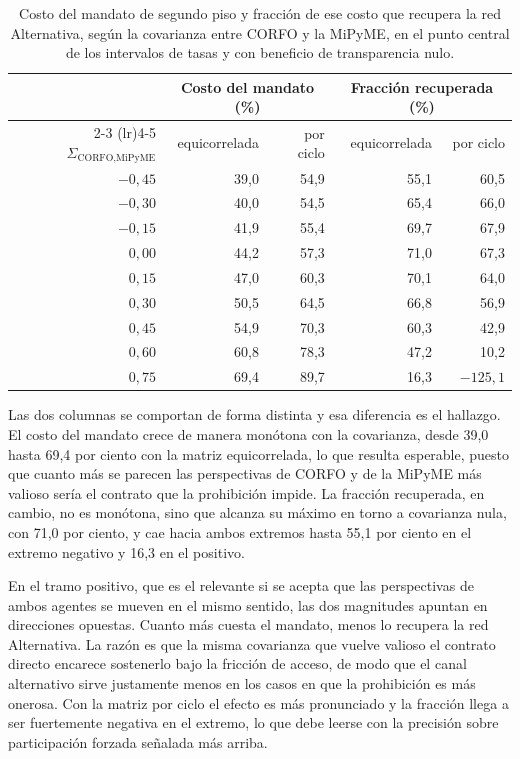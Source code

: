 \begin{table}[H]
    \centering
    \small
    \caption[Costo del mandato y fracción recuperada]{Costo del mandato de
    segundo piso y fracción de ese costo que recupera la red Alternativa, según
    la covarianza entre CORFO y la MiPyME, en el punto central de los
    intervalos de tasas y con beneficio de transparencia nulo.}
    \label{tab:contrafactual-sigma}
    \begin{tabular}{rrrrr}
        \toprule
        & \multicolumn{2}{c}{Costo del mandato (\%)} & \multicolumn{2}{c}{Fracción recuperada (\%)} \\
        \cmidrule(lr){2-3} \cmidrule(lr){4-5}
        $\Sigma_{\text{CORFO,MiPyME}}$ & equicorrelada & por ciclo & equicorrelada & por ciclo \\
        \midrule
        $-0{,}45$ & 39,0 & 54,9 & 55,1 & 60,5 \\
        $-0{,}30$ & 40,0 & 54,5 & 65,4 & 66,0 \\
        $-0{,}15$ & 41,9 & 55,4 & 69,7 & 67,9 \\
        $0{,}00$ & 44,2 & 57,3 & 71,0 & 67,3 \\
        $0{,}15$ & 47,0 & 60,3 & 70,1 & 64,0 \\
        $0{,}30$ & 50,5 & 64,5 & 66,8 & 56,9 \\
        $0{,}45$ & 54,9 & 70,3 & 60,3 & 42,9 \\
        $0{,}60$ & 60,8 & 78,3 & 47,2 & 10,2 \\
        $0{,}75$ & 69,4 & 89,7 & 16,3 & $-125{,}1$ \\
        \bottomrule
    \end{tabular}
\end{table}

Las dos columnas se comportan de forma distinta y esa diferencia es el hallazgo. El costo del mandato crece de manera monótona con la covarianza, desde 39,0 hasta 69,4 por ciento con la matriz equicorrelada, lo que resulta esperable, puesto que cuanto más se parecen las perspectivas de CORFO y de la MiPyME más valioso sería el contrato que la prohibición impide. La fracción recuperada, en cambio, no es monótona, sino que alcanza su máximo en torno a covarianza nula, con 71,0 por ciento, y cae hacia ambos extremos hasta 55,1 por ciento en el extremo negativo y 16,3 en el positivo.

En el tramo positivo, que es el relevante si se acepta que las perspectivas de ambos agentes se mueven en el mismo sentido, las dos magnitudes apuntan en direcciones opuestas. Cuanto más cuesta el mandato, menos lo recupera la red Alternativa. La razón es que la misma covarianza que vuelve valioso el contrato directo encarece sostenerlo bajo la fricción de acceso, de modo que el canal alternativo sirve justamente menos en los casos en que la prohibición es más onerosa. Con la matriz por ciclo el efecto es más pronunciado y la fracción llega a ser fuertemente negativa en el extremo, lo que debe leerse con la precisión sobre participación forzada señalada más arriba.

